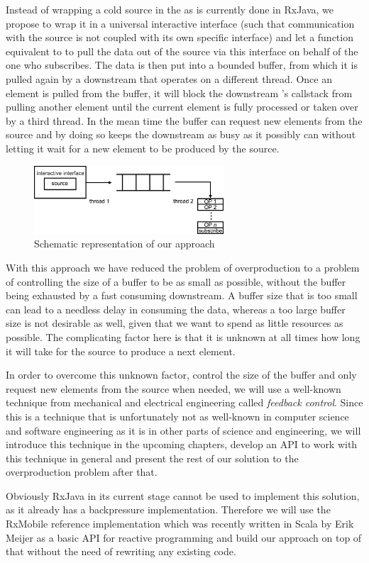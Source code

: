 Instead of wrapping a cold source in the  as is currently done in RxJava, we propose to wrap it in a universal interactive interface (such that communication with the source is not coupled with its own specific interface) and let a function equivalent to to  pull the data out of the source via this interface on behalf of the one who subscribes. The data is then put into a bounded buffer, from which it is pulled again by a downstream \obs that operates on a different thread. Once an element is pulled from the buffer, it will block the downstream \obs's callstack from pulling another element until the current element is fully processed or taken over by a third thread. In the mean time the buffer can request new elements from the source and by doing so keeps the downstream \obs as busy as it possibly can without letting it wait for a new element to be produced by the source.

\begin{figure}[H]
	\begin{center}
		\includegraphics[width=0.63\textwidth]{figures/Approach.png}
	\end{center}
	\caption{Schematic representation of our approach}
	\label{fig:new-approach}
\end{figure}

With this approach we have reduced the problem of overproduction to a problem of controlling the size of a buffer to be as small as possible, without the buffer being exhausted by a fast consuming downstream. A buffer size that is too small can lead to a needless delay in consuming the data, whereas a too large buffer size is not desirable as well, given that we want to spend as little resources as possible. The complicating factor here is that it is unknown at all times how long it will take for the source to produce a next element.

In order to overcome this unknown factor, control the size of the buffer and only request new elements from the source when needed, we will use a well-known technique from mechanical and electrical engineering called \textit{feedback control}. Since this is a technique that is unfortunately not as well-known in computer science and software engineering as it is in other parts of science and engineering, we will introduce this technique in the upcoming chapters, develop an API to work with this technique in general and present the rest of our solution to the overproduction problem after that.

Obviously RxJava in its current stage cannot be used to implement this solution, as it already has a backpressure implementation. Therefore we will use the RxMobile \cite{RxMobile} reference implementation which was recently written in Scala by Erik Meijer as a basic API for reactive programming and build our approach on top of that without the need of rewriting any existing code.
